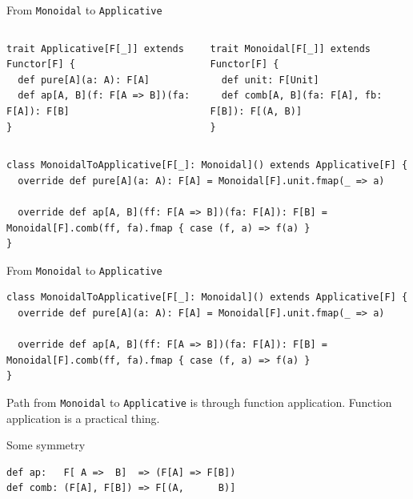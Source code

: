 \documentclass[presentation,aspectratio=169,smaller]{beamer}
\begin{document}
\begin{frame}[label={sec:orgd9eb57e},fragile]{From \texttt{Monoidal} to \texttt{Applicative}}
 \begin{columns}
\begin{column}[t]{0.5\columnwidth}
\begin{verbatim}
trait Applicative[F[_]] extends Functor[F] {
  def pure[A](a: A): F[A]
  def ap[A, B](f: F[A => B])(fa: F[A]): F[B]
}
\end{verbatim}
\end{column}

\begin{column}[t]{0.5\columnwidth}
\begin{verbatim}
trait Monoidal[F[_]] extends Functor[F] {
  def unit: F[Unit]
  def comb[A, B](fa: F[A], fb: F[B]): F[(A, B)]
}
\end{verbatim}
\end{column}
\end{columns}

\begin{verbatim}
class MonoidalToApplicative[F[_]: Monoidal]() extends Applicative[F] {
  override def pure[A](a: A): F[A] = Monoidal[F].unit.fmap(_ => a)

  override def ap[A, B](ff: F[A => B])(fa: F[A]): F[B] = Monoidal[F].comb(ff, fa).fmap { case (f, a) => f(a) }
}
\end{verbatim}
\end{frame}

\begin{frame}[label={sec:orgeae3340},fragile]{From \texttt{Monoidal} to \texttt{Applicative}}
 \begin{verbatim}
class MonoidalToApplicative[F[_]: Monoidal]() extends Applicative[F] {
  override def pure[A](a: A): F[A] = Monoidal[F].unit.fmap(_ => a)

  override def ap[A, B](ff: F[A => B])(fa: F[A]): F[B] = Monoidal[F].comb(ff, fa).fmap { case (f, a) => f(a) }
}
\end{verbatim}

Path from \texttt{Monoidal} to \texttt{Applicative} is through function application. Function
application is a practical thing.
\end{frame}

\begin{frame}[label={sec:orgcac3c40},fragile]{Some symmetry}
 \begin{verbatim}
def ap:   F[ A =>  B]  => (F[A] => F[B])
def comb: (F[A], F[B]) => F[(A,      B)]
\end{verbatim}
\end{frame}
\end{document}
